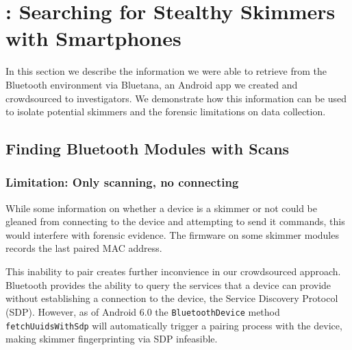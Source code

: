 \section{\bluetana: Searching for Stealthy Skimmers with Smartphones}
\label{sec:tool}

In this section we describe the information we were able to retrieve from the
Bluetooth environment via Bluetana, an Android app we created and crowdsourced
to investigators.
%
We demonstrate how this information can be used to isolate potential skimmers
and the forensic limitations on data collection.


\subsection{Finding Bluetooth Modules with Scans} %

 

\subsubsection{Limitation: Only scanning, no connecting} %
\label{sec:cant-connect}

While some information on whether a device is a skimmer or not could be gleaned
from connecting to the device and attempting to send it commands, this would
interfere with forensic evidence.
%
The firmware on some skimmer modules records the last paired MAC address.

This inability to pair creates further inconvience in our crowdsourced approach.
%
Bluetooth provides the ability to query the services that a device can provide
without establishing a connection to the device, the Service Discovery Protocol
(SDP).
%
However, as of Android 6.0 the \texttt{BluetoothDevice} method
\texttt{fetchUuidsWithSdp} will automatically trigger a pairing process with the
device, making skimmer fingerprinting via SDP infeasible.
 

